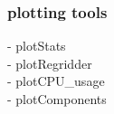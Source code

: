 \subsubsection{plotting tools}
- plotStats\\
- plotRegridder \\
- plotCPU\_usage \\
- plotComponents

